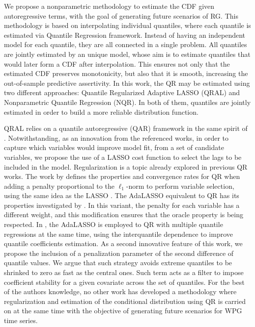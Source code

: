 We propose a nonparametric methodology to estimate the CDF given autoregressive terms, with the goal of generating future scenarios of RG. This methodology is based on interpolating individual quantiles, where each quantile is estimated via Quantile Regression framework.
Instead of having an independent model for each quantile, they are all connected in a single problem. All quantiles are jointly estimated by an unique model, whose aim is to estimate quantiles that would later form a CDF after interpolation. This ensures not only that the estimated CDF preserves monotonicity, but also that it is smooth, increasing the out-of-sample predictive assertivity.
In this work, the QR may be estimated using two different approaches: Quantile Regularized Adaptive LASSO (QRAL) and Nonparametric Quantile Regression (NQR). In both of them, quantiles are jointly estimated in order to build a more reliable distribution function. 


QRAL relies on a quantile autoregressive (QAR) framework in the same spirit of \cite{koenker1978regression,koenker_quantile_2006,koenker2005quantile}. Notwithstanding, as an innovation from the referenced works, in order to capture which variables would improve model fit, from a set of candidate variables, we propose the use of a LASSO cost function to select the lags to be included in the model.
Regularization is a topic already explored in previous QR works.
The work by \cite{belloni_l1-penalized_2009} defines the properties and convergence rates for QR when adding a penalty proportional to the $\ell_1$-norm to perform variable selection, using the same idea as the LASSO \cite{tibshirani1996regression}. The AdaLASSO equivalent to QR has its properties investigated by \cite{ciuperca_adaptive_2016}. In this variant, the penalty for each variable has a different weight, and this modification ensures that the oracle property is being respected. %
In \cite{zou_regularized_2008,jiang_interquantile_2014}, the AdaLASSO is employed to QR with multiple quantile regressions at the same time, using the interquantile dependence to improve  quantile coefficients estimation.
As a second innovative feature of this work, we propose the inclusion of a penalization parameter of the second difference of quantile values. We argue that such strategy avoids extreme quantiles to be shrinked to zero as fast as the central ones. Such term acts as a filter to impose coefficient stability for a given covariate across the set of quantiles.
For the best of the authors knowledge, no other work has developed a methodology where regularization and estimation of the conditional distribution using QR is carried on at the same time with the objective of generating future scenarios for WPG time series.


